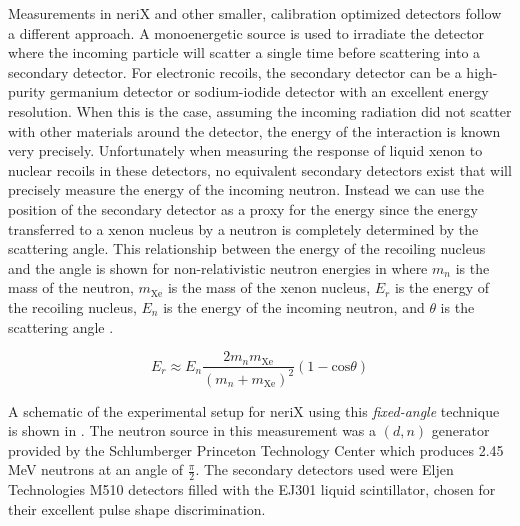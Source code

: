 Measurements in neriX and other smaller, calibration optimized detectors follow a different approach.  A monoenergetic source is used to irradiate the detector where the incoming particle will scatter a single time before scattering into a secondary detector.  For electronic recoils, the secondary detector can be a high-purity germanium detector or sodium-iodide detector with an excellent energy resolution.  When this is the case, assuming the incoming radiation did not scatter with other materials around the detector, the energy of the interaction is known very precisely.  Unfortunately when measuring the response of liquid xenon to nuclear recoils in these detectors, no equivalent secondary detectors exist that will precisely measure the energy of the incoming neutron.  Instead we can use the position of the secondary detector as a proxy for the energy since the energy transferred to a xenon nucleus by a neutron is completely determined by the scattering angle.  This relationship between the energy of the recoiling nucleus and the angle is shown for non-relativistic neutron energies in  where $m_n$ is the mass of the neutron, $m_{\textrm{Xe}}$ is the mass of the xenon nucleus, $E_r$ is the energy of the recoiling nucleus, $E_n$ is the energy of the incoming neutron, and $\theta$ is the scattering angle \cite{knoll2010radiation}.

\begin{equation}
        \label{eqn:nerix_energy_scattering_angle}
        E_r \approx E_n \frac{2 m_n m_{\textrm{Xe}}}{(m_n + m_{\textrm{Xe}})^2}(1 - \textrm{cos} \theta)
\end{equation}

A schematic of the experimental setup for neriX using this \textit{fixed-angle} technique is shown in .  The neutron source in this measurement was a $(d, n)$ generator provided by the Schlumberger Princeton Technology Center which produces 2.45 MeV neutrons at an angle of $\frac{\pi}{2}$.  The secondary detectors used were Eljen Technologies M510 detectors filled with the EJ301 liquid scintillator, chosen for their excellent pulse shape discrimination.  


